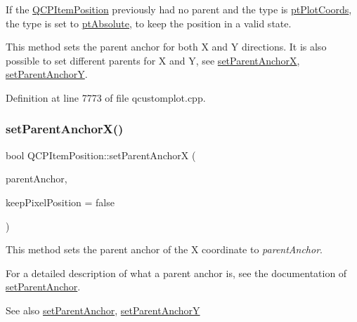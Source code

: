 If the \hyperlink{class_q_c_p_item_position}{Q\+C\+P\+Item\+Position} previously had no parent and the type is \hyperlink{class_q_c_p_item_position_aad9936c22bf43e3d358552f6e86dbdc8ad5ffb8dc99ad73263f7010c77342294c}{pt\+Plot\+Coords}, the type is set to \hyperlink{class_q_c_p_item_position_aad9936c22bf43e3d358552f6e86dbdc8a564f5e53e550ead1ec5fc7fc7d0b73e0}{pt\+Absolute}, to keep the position in a valid state.

This method sets the parent anchor for both X and Y directions. It is also possible to set different parents for X and Y, see \hyperlink{class_q_c_p_item_position_add71461a973927c74e42179480916d9c}{set\+Parent\+AnchorX}, \hyperlink{class_q_c_p_item_position_add5ec1db9d19cec58a3b5c9e0a0c3f9d}{set\+Parent\+AnchorY}. 

Definition at line 7773 of file qcustomplot.\+cpp.

\mbox{\label{class_q_c_p_item_position_add71461a973927c74e42179480916d9c}} 
\subsubsection{\texorpdfstring{set\+Parent\+Anchor\+X()}{setParentAnchorX()}}
{\footnotesize\ttfamily bool Q\+C\+P\+Item\+Position\+::set\+Parent\+AnchorX (\begin{DoxyParamCaption}\item[{\hyperlink{class_q_c_p_item_anchor}{Q\+C\+P\+Item\+Anchor} $\ast$}]{parent\+Anchor,  }\item[{bool}]{keep\+Pixel\+Position = {\ttfamily false} }\end{DoxyParamCaption})}

This method sets the parent anchor of the X coordinate to {\itshape parent\+Anchor}.

For a detailed description of what a parent anchor is, see the documentation of \hyperlink{class_q_c_p_item_position_ac094d67a95d2dceafa0d50b9db3a7e51}{set\+Parent\+Anchor}.

\begin{DoxySeeAlso}{See also}
\hyperlink{class_q_c_p_item_position_ac094d67a95d2dceafa0d50b9db3a7e51}{set\+Parent\+Anchor}, \hyperlink{class_q_c_p_item_position_add5ec1db9d19cec58a3b5c9e0a0c3f9d}{set\+Parent\+AnchorY} 
\end{DoxySeeAlso}



